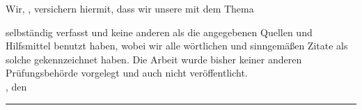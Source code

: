 \clearpage
{}

Wir, \autorName, versichern hiermit, dass wir unsere \textbf{\betreff} mit dem
Thema
\begin{quote}
\textit{\kompletterTitel}
\end{quote}
selbständig verfasst und keine anderen als die angegebenen Quellen und Hilfsmittel benutzt haben,
wobei wir alle wörtlichen und sinngemäßen Zitate als solche gekennzeichnet haben. Die Arbeit
wurde bisher keiner anderen Prüfungsbehörde vorgelegt und auch nicht veröffentlicht.\\[6ex]

\abgabeOrt, den \abgabeTermin


\rule[-0.2cm]{15.5cm}{0.5pt}

\textsc{\autorName}
